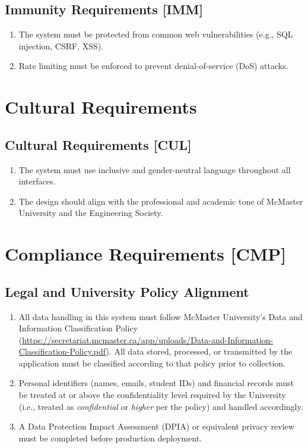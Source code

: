 \documentclass[12pt]{article}
\begin{document}
\subsection{Immunity Requirements [IMM]}
\begin{enumerate}
    \item The system must be protected from common web vulnerabilities (e.g., SQL injection, CSRF, XSS).
    \item Rate limiting must be enforced to prevent denial-of-service (DoS) attacks.
\end{enumerate}

\section{Cultural Requirements}

\subsection{Cultural Requirements [CUL]}
\begin{enumerate}
    \item The system must use inclusive and gender-neutral language throughout all interfaces.
    \item The design should align with the professional and academic tone of McMaster University and the Engineering Society.
\end{enumerate}

\section{Compliance Requirements [CMP]}

\subsection{Legal and University Policy Alignment}
\begin{enumerate}
  \item All data handling in this system must follow McMaster University's Data and Information Classification Policy (\url{https://secretariat.mcmaster.ca/app/uploads/Data-and-Information-Classification-Policy.pdf}).  All data stored, processed, or transmitted by the application must be classified according to that policy prior to collection.
  \item Personal identifiers (names, emails, student IDs) and financial records must be treated at or above the confidentiality level required by the University (i.e., treated as \textit{confidential} or \textit{higher} per the policy) and handled accordingly.
  \item A Data Protection Impact Assessment (DPIA) or equivalent privacy review must be completed before production deployment.
\end{enumerate}
\end{document}
